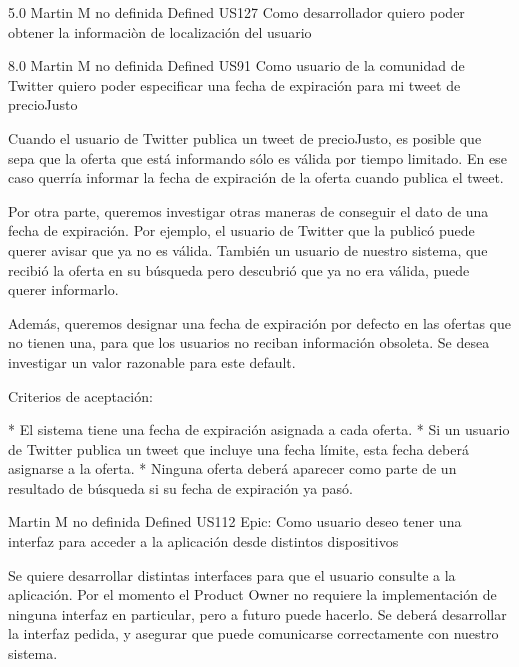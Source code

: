 	{} %
	{5.0} %
	{Martin M} %
	{no definida} %
	{Defined} %
\userStory
	{US127} %
	{Como desarrollador quiero poder obtener la informaciòn de localización del usuario} %
	{

} %
	{} %
	{8.0} %
	{Martin M} %
	{no definida} %
	{Defined} %
\userStory
	{US91} %
	{Como usuario de la comunidad de Twitter quiero poder especificar una fecha de expiración para mi tweet de precioJusto} %
	{Cuando el usuario de Twitter publica un tweet de precioJusto, es posible que
sepa que la oferta que está informando sólo es válida por tiempo limitado. En
ese caso querría informar la fecha de expiración de la oferta cuando publica
el tweet.

Por otra parte, queremos investigar otras maneras de conseguir el dato de una
fecha de expiración. Por ejemplo, el usuario de Twitter que la publicó puede
querer avisar que ya no es válida. También un usuario de nuestro sistema, que
recibió la oferta en su búsqueda pero descubrió que ya no era válida, puede
querer informarlo.

  
Además, queremos designar una fecha de expiración por defecto en las ofertas
que no tienen una, para que los usuarios no reciban información obsoleta. Se
desea investigar un valor razonable para este default.

  
Criterios de aceptación:

* El sistema tiene una fecha de expiración asignada a cada oferta.  
* Si un usuario de Twitter publica un tweet que incluye una fecha límite, esta fecha deberá asignarse a la oferta.  
* Ninguna oferta deberá aparecer como parte de un resultado de búsqueda si su fecha de expiración ya pasó.

} %
	{} %
	{} %
	{Martin M} %
	{no definida} %
	{Defined} %
\userStory
	{US112} %
	{Epic: Como usuario deseo tener una interfaz para acceder a la aplicación desde distintos dispositivos} %
	{Se quiere desarrollar distintas interfaces para que el usuario consulte a la
aplicación. Por el momento el Product Owner no requiere la implementación de
ninguna interfaz en particular, pero a futuro puede hacerlo. Se deberá
desarrollar la interfaz pedida, y asegurar que puede comunicarse correctamente
con nuestro sistema.

} %
